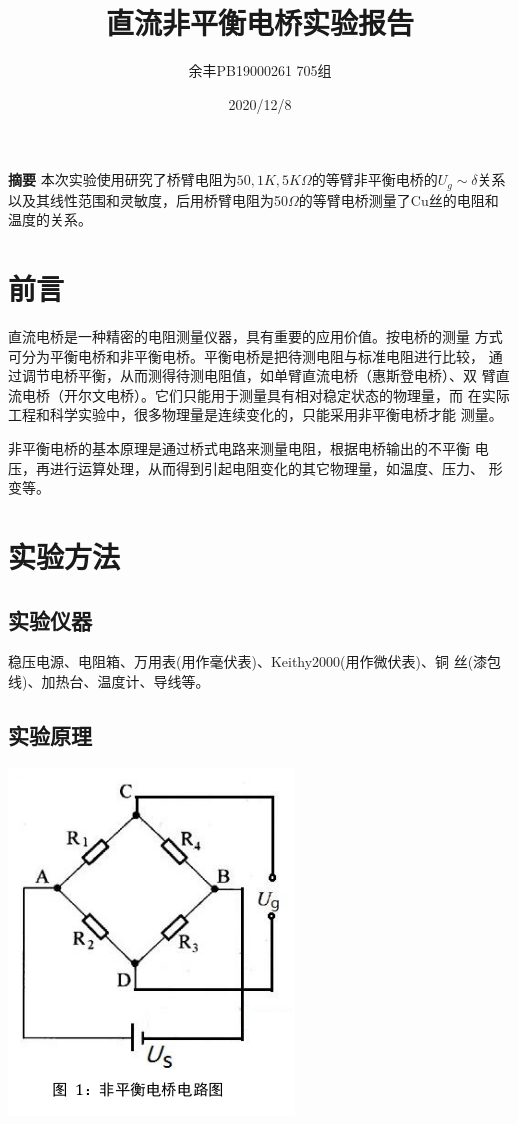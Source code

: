 \documentclass[UEF8]{ctexart}
\title{直流非平衡电桥实验报告}
\author{余丰\quad PB19000261 \quad 705组}
\date{2020/12/8}
\begin{document}
\maketitle
{\bfseries 摘要} \quad 本次实验使用研究了桥臂电阻为$50,1K,5K\Omega$的等臂非平衡电桥的$U_{g}\sim\delta$关系以及其线性范围和灵敏度，后用桥臂电阻为50$\Omega$的等臂电桥测量了Cu丝的电阻和温度的关系。

\begin{multicols}{2}
\section{前言}
直流电桥是一种精密的电阻测量仪器，具有重要的应用价值。按电桥的测量
方式可分为平衡电桥和非平衡电桥。平衡电桥是把待测电阻与标准电阻进行比较，
通过调节电桥平衡，从而测得待测电阻值，如单臂直流电桥（惠斯登电桥）、双
臂直流电桥（开尔文电桥）。它们只能用于测量具有相对稳定状态的物理量，而
在实际工程和科学实验中，很多物理量是连续变化的，只能采用非平衡电桥才能
测量。

非平衡电桥的基本原理是通过桥式电路来测量电阻，根据电桥输出的不平衡
电压，再进行运算处理，从而得到引起电阻变化的其它物理量，如温度、压力、
形变等。
\section{实验方法}

\subsection{实验仪器}
稳压电源、电阻箱、万用表(用作毫伏表)、Keithy2000(用作微伏表)、铜
丝(漆包线)、加热台、温度计、导线等。
\subsection{实验原理}

\includegraphics[scale=0.42]{graphs/p1.png}


\end{multicols}
\end{document}
